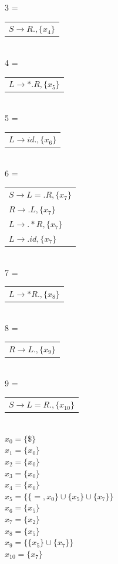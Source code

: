 3 = 
\begin{tabular}{l}
	$S \rightarrow R., \{ x_4 \}$\\
\end{tabular}\\[5pt]

4 = 
\begin{tabular}{l}
	$L \rightarrow *.R, \{ x_5 \}$\\
\end{tabular}\\[5pt]

5 = 
\begin{tabular}{l}
	$L \rightarrow id., \{ x_6 \}$\\
\end{tabular}\\[5pt]

6 = 
\begin{tabular}{l}
	$S \rightarrow L = .R, \{ x_7 \}$\\
	$R \rightarrow .L, \{ x_7 \}$\\
	$L \rightarrow .*R, \{ x_7 \}$\\
	$L \rightarrow .id, \{ x_7 \}$\\
\end{tabular}\\[5pt]

7 = 
\begin{tabular}{l}
	$L \rightarrow *R., \{ x_8 \}$\\
\end{tabular}\\[5pt]

8 = 
\begin{tabular}{l}
	$R \rightarrow L., \{ x_9 \}$\\
\end{tabular}\\[5pt]

9 = 
\begin{tabular}{l}
	$S \rightarrow L = R., \{ x_10 \}$\\
\end{tabular}\\[5pt]

$x_0 = \{ \$ \}$ \\
$x_1 = \{ x_0 \}$ \\
$x_2 = \{ x_0 \}$ \\
$x_3 = \{ x_0 \}$ \\
$x_4 = \{ x_0 \}$ \\
$x_5 = \{ \{ =, x_0 \} \cup \{ x_5 \} \cup \{ x_7 \} \}$  \\
$x_6 = \{ x_5 \}$ \\
$x_7 = \{ x_2 \}$ \\
$x_8 = \{ x_5 \}$ \\
$x_9 = \{ \{x_5\} \cup \{ x_7\} \}$ \\
$x_10 = \{ x_7 \}$ \\

